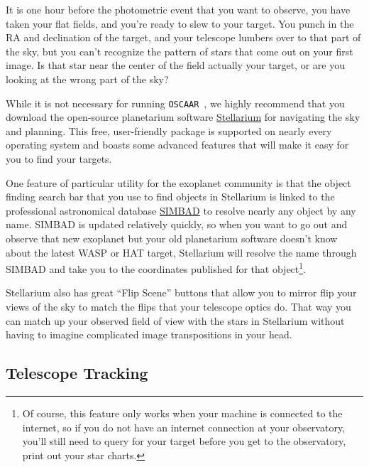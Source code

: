 \documentclass[a4paper]{article}
\newcommand{\code}[1]{\texttt{#1}}
\newcommand{\oscaar}{\code{OSCAAR}~}
\begin{document}
It is one hour before the photometric event that you want to observe, you have taken your flat fields, and you're ready to slew to your target. You punch in the RA and declination of the target, and your telescope lumbers over to that part of the sky, but you can't recognize the pattern of stars that come out on your first image. Is that star near the center of the field actually your target, or are you looking at the wrong part of the sky? 

While it is not necessary for running \oscaar, we highly recommend that you download the open-source planetarium software \href{http://www.stellarium.org/}{Stellarium} for navigating the sky and planning. This free, user-friendly package is supported on nearly every operating system and boasts some advanced features that will make it easy for you to find your targets. 

One feature of particular utility for the exoplanet community is that the object finding search bar that you use to find objects in Stellarium is linked to the professional astronomical database \href{http://simbad.harvard.edu/simbad/}{SIMBAD} to resolve nearly any object by any name. SIMBAD is updated relatively quickly, so when you want to go out and observe that new exoplanet but your old planetarium software doesn't know about the latest WASP or HAT target, Stellarium will resolve the name through SIMBAD and take you to the coordinates published for that object\footnote{Of course, this feature only works when your machine is connected to the internet, so if you do not have an internet connection at your observatory, you'll still need to query for your target before you get to the observatory, print out your star charts.}.

Stellarium also has great ``Flip Scene'' buttons that allow you to mirror flip your views of the sky to match the flips that your telescope optics do. That way you can match up your observed field of view with the stars in Stellarium without having to imagine complicated image transpositions in your head.

\subsection{Telescope Tracking}
\end{document}
